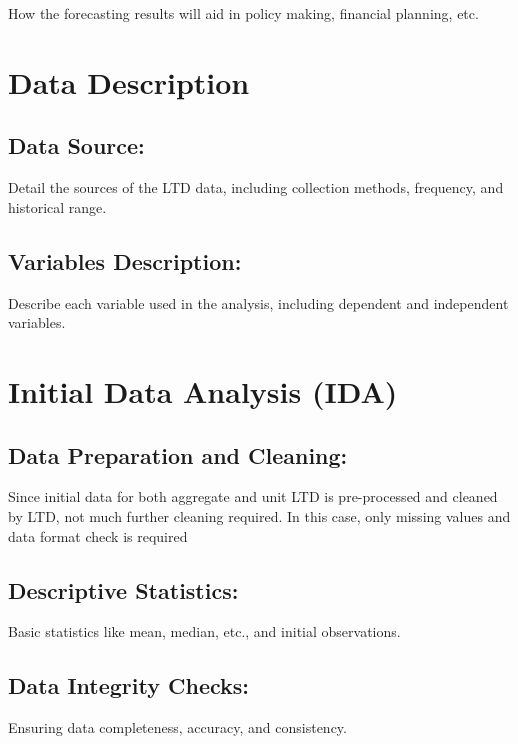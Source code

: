 \documentclass[11pt,a4paper,]{article}
\begin{document}
How the forecasting results will aid in policy making, financial planning, etc.

\section{Data Description}\label{data-description}

\subsection{Data Source:}\label{data-source}

Detail the sources of the LTD data, including collection methods, frequency, and historical range.

\subsection{Variables Description:}\label{variables-description}

Describe each variable used in the analysis, including dependent and independent variables.

\section{Initial Data Analysis (IDA)}\label{initial-data-analysis-ida}

\subsection{Data Preparation and Cleaning:}\label{data-preparation-and-cleaning}

Since initial data for both aggregate and unit LTD is pre-processed and cleaned by LTD, not much further cleaning required. In this case, only missing values and data format check is required

\subsection{Descriptive Statistics:}\label{descriptive-statistics}

Basic statistics like mean, median, etc., and initial observations.

\subsection{Data Integrity Checks:}\label{data-integrity-checks}

Ensuring data completeness, accuracy, and consistency.
\end{document}
